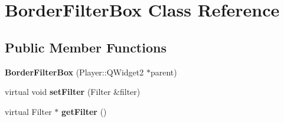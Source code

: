 \hypertarget{classBorderFilterBox}{}\section{Border\+Filter\+Box Class Reference}
\label{classBorderFilterBox}
\subsection*{Public Member Functions}
\begin{DoxyCompactItemize}
\item 
\hypertarget{classBorderFilterBox_a918bb4ee9d5e5ab1880aba9c4035f9fb}{}{\bfseries Border\+Filter\+Box} (Player\+::\+Q\+Widget2 $\ast$parent)\label{classBorderFilterBox_a918bb4ee9d5e5ab1880aba9c4035f9fb}

\item 
\hypertarget{classBorderFilterBox_a09e99b0db09b8468ce7d7e0f98293ac5}{}virtual void {\bfseries set\+Filter} (Filter \&filter)\label{classBorderFilterBox_a09e99b0db09b8468ce7d7e0f98293ac5}

\item 
\hypertarget{classBorderFilterBox_ad7b14770615490d1445c958c79fd3adb}{}virtual Filter $\ast$ {\bfseries get\+Filter} ()\label{classBorderFilterBox_ad7b14770615490d1445c958c79fd3adb}

\end{DoxyCompactItemize}
